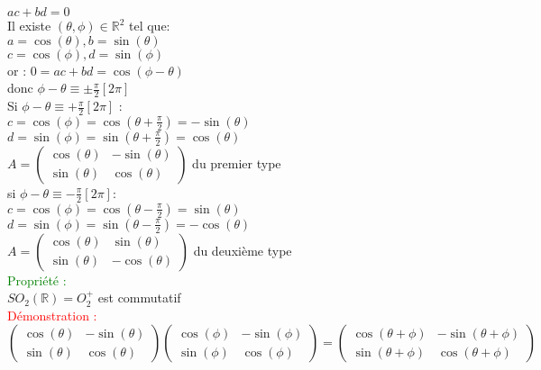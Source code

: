 \documentclass{article}
\begin{document}
$ac+bd=0$ \\
Il existe $(\theta,\phi) \in \mathbb R^2$ tel que: \\
$a=\cos(\theta),b=\sin(\theta)$ \\
$c=\cos(\phi),d=\sin(\phi)$ \\
or : $0= ac+bd=  \cos(\phi-\theta)$ \\
donc $\phi- \theta \equiv \pm \frac \pi 2 [2\pi]$ \\
Si $\phi - \theta \equiv  +\frac \pi 2 [2 \pi ]$ : \\
$c=\cos(\phi)=\cos(\theta + \frac \pi 2)=-\sin(\theta)$ \\
$d=\sin(\phi)=\sin(\theta + \frac \pi 2)=\cos(\theta)$ \\
$A=\begin{pmatrix}
\cos(\theta) &- \sin(\theta) \\
\sin(\theta) & \cos(\theta)
\end{pmatrix}$ du premier type  \\
si $\phi - \theta \equiv - \frac \pi 2 [2\pi] :$ \\
$c=\cos(\phi)=\cos(\theta-\frac \pi 2)= \sin(\theta)$ \\
$d=\sin(\phi)=\sin(\theta-\frac \pi 2)=-\cos(\theta)$ \\
$A=\begin{pmatrix}
\cos(\theta) & \sin(\theta) \\
\sin(\theta) & -\cos(\theta)
\end{pmatrix}$ du deuxième type \\
\textcolor{green}{Propriété :} \\
$SO_2(\mathbb R)=O_2^+$ est commutatif\\
\textcolor{red}{Démonstration :} \\
$\begin{pmatrix}
\cos(\theta) & -\sin(\theta) \\
\sin(\theta) & \cos(\theta)
\end{pmatrix}
\begin{pmatrix}
\cos(\phi) & - \sin(\phi) \\
\sin(\phi) & \cos(\phi)
\end{pmatrix}
=
\begin{pmatrix}
\cos(\theta + \phi) & - \sin(\theta + \phi) \\
\sin(\theta + \phi) & \cos(\theta + \phi)
\end{pmatrix}$
\end{document}
